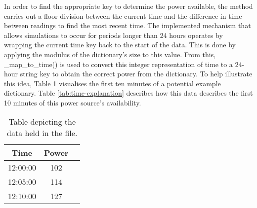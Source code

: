 \documentclass{l4proj}
\begin{document}
In order to find the appropriate key to determine the power available, the method carries out a floor division between the current time and the difference in time between readings to find the most recent time.
The implemented mechanism that allows simulations to occur for periods longer than 24 hours operates by wrapping the current time key back to the start of the data.
This is done by applying the modulus of the dictionary's size to this value.
From this, \_map\_to\_time() is used to convert this integer representation of time to a 24-hour string key to obtain the correct power from the dictionary.
To help illustrate this idea, Table \ref{tab:data-dic} visualises the first ten minutes of a potential example dictionary.
Table \ref{tab:time-explanation} describes how this data describes the first 10 minutes of this power source's availability.
\begin{table}[h]
    \caption{Table depicting the data held in the file.}
    \label{tab:data-dic}
    \centering
    \begin{tabular}{@{}ccc@{}}
    \toprule
    \textbf{Time} & \textbf{Power} \\
    \midrule
    12:00:00      & 102            \\
    12:05:00      & 114            \\
    12:10:00      & 127            \\
    \bottomrule
    \end{tabular}


\end{table}
\end{document}
